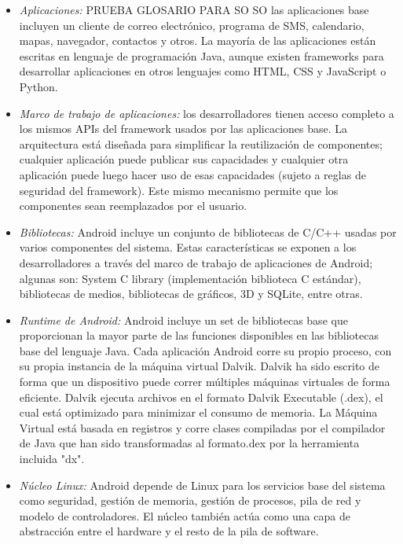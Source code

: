 \begin{itemize}
    \item \emph{Aplicaciones:} PRUEBA GLOSARIO PARA SO \gls{SO} las aplicaciones base incluyen un cliente de correo electrónico, programa de SMS, calendario, mapas, navegador, contactos y otros. La mayoría de las aplicaciones están escritas en lenguaje de programación \gls{Java}, aunque existen \gls{framework}s para desarrollar aplicaciones en otros lenguajes como \gls{HTML}, \gls{CSS} y \gls{JavaScript} o \gls{Python}.
    \item \emph{Marco de trabajo de aplicaciones:} los desarrolladores tienen acceso completo a los mismos APIs del framework usados por las aplicaciones base. La arquitectura está diseñada para simplificar la reutilización de componentes; cualquier aplicación puede publicar sus capacidades y cualquier otra aplicación puede luego hacer uso de esas capacidades (sujeto a reglas de seguridad del framework). Este mismo mecanismo permite que los componentes sean reemplazados por el usuario.
    \item \emph{Bibliotecas:} Android incluye un conjunto de bibliotecas de C/C++ usadas por varios componentes del sistema. Estas características se exponen a los desarrolladores a través del marco de trabajo de aplicaciones de Android; algunas son: System C library (implementación biblioteca C estándar), bibliotecas de medios, bibliotecas de gráficos, 3D y SQLite, entre otras.
    \item \emph{Runtime de Android:} Android incluye un set de bibliotecas base que proporcionan la mayor parte de las funciones disponibles en las bibliotecas base del lenguaje Java. Cada aplicación Android corre su propio proceso, con su propia instancia de la máquina virtual Dalvik. Dalvik ha sido escrito de forma que un dispositivo puede correr múltiples máquinas virtuales de forma eficiente. Dalvik ejecuta archivos en el formato Dalvik Executable (.dex), el cual está optimizado para minimizar el consumo de memoria. La Máquina Virtual está basada en registros y corre clases compiladas por el compilador de Java que han sido transformadas al formato.dex por la herramienta incluida "dx".
    
    \item \emph{Núcleo \gls{Linux}:} Android depende de Linux para los servicios base del sistema como seguridad, gestión de memoria, gestión de procesos, pila de red y modelo de controladores. El núcleo también actúa como una capa de abstracción entre el hardware y el resto de la pila de software.
   
 \end{itemize}

